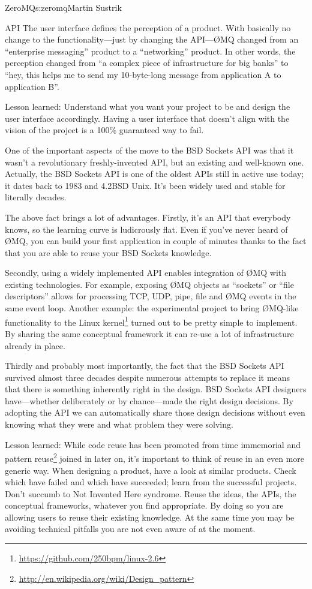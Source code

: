 \begin{aosachapter}{ZeroMQ}{s:zeromq}{Martin Sustrik}
\begin{aosasect1}{API}
The user interface defines the perception of a product. With basically
no change to the functionality---just by changing the API---{\O}MQ 
changed from an ``enterprise messaging'' product to a ``networking''
product. In other words, the perception changed from ``a complex piece
of infrastructure for big banks'' to ``hey, this helps me to send my
10-byte-long message from application A to application B''.

Lesson learned: Understand what you want your project to be and design
the user interface accordingly. Having a user interface that doesn't align with
the vision of the project is a 100\% guaranteed way to fail.

One of the important aspects of the move to the BSD Sockets API was that it
wasn't a revolutionary freshly-invented API, but an existing and
well-known one. Actually, the BSD Sockets API is one of the oldest APIs
still in active use today; it dates back to 1983 and 4.2BSD Unix. It's been
widely used and stable for literally decades.

The above fact brings a lot of advantages.  Firstly, it's an API that
everybody knows, so the learning curve is ludicrously flat. Even if
you've never heard of {\O}MQ, you can build your first application
in couple of minutes thanks to the fact that you are able to reuse
your BSD Sockets knowledge.

Secondly, using a widely implemented API enables integration of {\O}MQ
with existing technologies. For example, exposing {\O}MQ objects as
``sockets'' or ``file descriptors'' allows for processing TCP, UDP,
pipe, file and {\O}MQ events in the same event loop. Another example: the
experimental project to bring {\O}MQ-like functionality to the Linux
kernel\footnote{\url{https://github.com/250bpm/linux-2.6}} turned out
to be pretty simple to implement. By sharing the same conceptual
framework it can re-use a lot of infrastructure already in place.

Thirdly and probably most importantly, the fact that the BSD Sockets
API survived almost three decades despite numerous attempts to
replace it means that there is something inherently right in the
design. BSD Sockets API designers have---whether deliberately or by
chance---made the right design decisions. By adopting the API we can
automatically share those design decisions without even knowing what
they were and what problem they were solving.

Lesson learned: While code reuse has been promoted from time
immemorial and pattern
reuse\footnote{\url{http://en.wikipedia.org/wiki/Design_pattern}}
joined in later on, it's important to think of reuse in an
even more generic way. When designing a product, have a look at similar
products. Check which have failed and which have succeeded; learn from
the successful projects. Don't succumb to Not Invented Here
syndrome. Reuse
the ideas, the APIs, the conceptual frameworks, whatever you find
appropriate. By doing so you are allowing users to reuse their
existing knowledge. At the same time you may be avoiding technical
pitfalls you are not even aware of at the moment.


\end{aosasect1}
\end{aosachapter}

